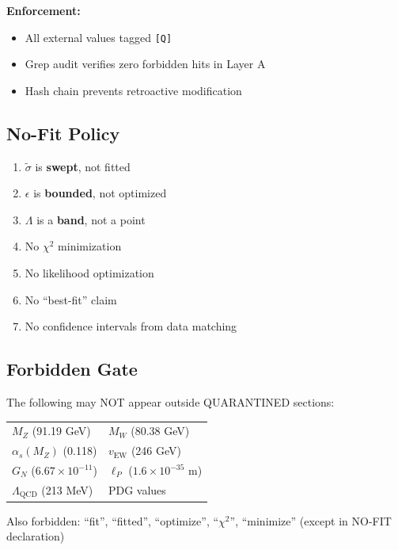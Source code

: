 \documentclass[11pt,a4paper]{article}
\theoremstyle{definition}
\begin{document}
\textbf{Enforcement:}
\begin{itemize}
  \item All external values tagged \texttt{[Q]}
  \item Grep audit verifies zero forbidden hits in Layer A
  \item Hash chain prevents retroactive modification
\end{itemize}

\subsection{No-Fit Policy}
\label{subsec:no-fit}

\begin{nofitbox}
\begin{enumerate}
  \item $\tilde{\sigma}$ is \textbf{swept}, not fitted
  \item $\epsilon$ is \textbf{bounded}, not optimized
  \item $\Lambda$ is a \textbf{band}, not a point
  \item No $\chi^2$ minimization
  \item No likelihood optimization
  \item No ``best-fit'' claim
  \item No confidence intervals from data matching
\end{enumerate}
\end{nofitbox}

\subsection{Forbidden Gate}
\label{subsec:forbidden}

\begin{forbiddenbox}
The following may NOT appear outside QUARANTINED sections:
\begin{center}
\begin{tabular}{ll}
$M_Z$ (91.19 GeV) & $M_W$ (80.38 GeV) \\
$\alpha_s(M_Z)$ (0.118) & $v_{\text{EW}}$ (246 GeV) \\
$G_N$ ($6.67 \times 10^{-11}$) & $\ell_P$ ($1.6 \times 10^{-35}$ m) \\
$\Lambda_{\text{QCD}}$ (213 MeV) & PDG values \\
\end{tabular}
\end{center}

Also forbidden: ``fit'', ``fitted'', ``optimize'', ``$\chi^2$'', ``minimize''
(except in NO-FIT declaration)
\end{forbiddenbox}
\end{document}
